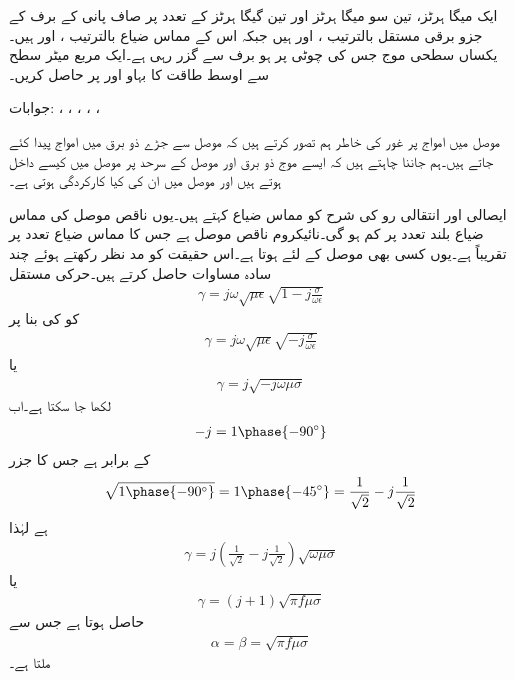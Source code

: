 ایک میگا ہرٹز، تین سو میگا ہرٹز اور تین گیگا ہرٹز کے تعدد پر صاف پانی کے برف کے جزو برقی مستقل بالترتیب  ،  اور  ہیں جبکہ اس کے مماس ضیاع بالترتیب  ،   اور  ہیں۔ یکساں سطحی موج جس کی چوٹی  پر  ہو برف سے گزر رہی ہے۔ایک مربع میٹر سطح سے اوسط طاقت کا بہاو  اور  پر حاصل کریں۔

جوابات: ، ، ، ،  ،   

موصل میں امواج پر غور کی خاطر ہم تصور کرتے ہیں کہ موصل سے جڑے ذو برق میں امواج پیدا کئے جاتے ہیں۔ہم جاننا چاہتے ہیں کہ ایسے موج ذو برق اور موصل کے سرحد پر موصل میں کیسے داخل ہوتے ہیں اور موصل میں ان کی کیا کارکردگی ہوتی ہے۔

ایصالی اور انتقالی رو کی شرح  کو مماس ضیاع کہتے ہیں۔یوں ناقص موصل کی مماس ضیاع بلند تعدد پر کم ہو گی۔نائیکروم ناقص موصل ہے جس کا مماس ضیاع  تعدد پر  تقریباً  ہے۔یوں کسی بھی موصل کے لئے  ہوتا ہے۔اس حقیقت کو مد نظر رکھتے ہوئے چند سادہ مساوات حاصل کرتے ہیں۔حرکی مستقل
\begin{align*}
\gamma=j \omega \sqrt{\mu \epsilon} \sqrt{1-j \frac{\sigma}{\omega \epsilon}}
\end{align*}
کو  کی بنا پر
\begin{align*}
\gamma=j \omega \sqrt{\mu \epsilon}\sqrt{-j \frac{\sigma}{\omega \epsilon}}
\end{align*}
یا
\begin{align*}
\gamma=j \sqrt{-j \omega \mu \sigma}
\end{align*}
لکھا جا سکتا ہے۔اب
\begin{align*}
-j = 1\phase{-90^\circ}
\end{align*}
کے برابر ہے جس کا جزر
\begin{align*}
\sqrt{1\phase{-90^\circ}}=1\phase{-45^\circ}=\frac{1}{\sqrt{2}}-j \frac{1}{\sqrt{2}}
\end{align*}
ہے لہٰذا
\begin{align*}
\gamma=j \left(\frac{1}{\sqrt{2}}-j \frac{1}{\sqrt{2}}\right)\sqrt{\omega \mu \sigma}
\end{align*}
یا
\begin{align}
\gamma=\left(j+1 \right)\sqrt{\pi f \mu \sigma}
\end{align}
حاصل ہوتا ہے جس سے
\begin{align}
\alpha=\beta=\sqrt{\pi f \mu \sigma}
\end{align}
ملتا ہے۔

